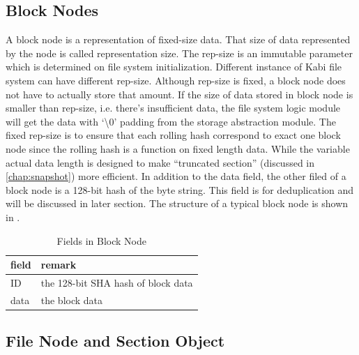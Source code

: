 \subsection{Block Nodes}

    A block node is a representation of fixed-size data. That size of data represented by the node is called representation size. The rep-size is an immutable parameter which is determined on file system initialization. Different instance of Kabi file system can have different rep-size. Although rep-size is fixed, a block node does not have to actually store that amount. If the size of data stored in block node is smaller than rep-size, i.e. there's insufficient data, the file system logic module will get the data with `\textbackslash0' padding from the storage abstraction module. The fixed rep-size is to ensure that each rolling hash correspond to exact one block node since the rolling hash is a function on fixed length data. While the variable actual data length is designed to make ``truncated section'' (discussed in \cref{chap:snapshot}) more efficient. In addition to the data field, the other filed of a block node is a 128-bit hash of the byte string. This field is for deduplication and will be discussed in later section. The structure of a typical block node is shown in .

\begin{table}[t]
\begin{center}
\begin{tabular}{ll}
\toprule
field & remark\\
\midrule
ID & the 128-bit SHA hash of block data\\
data & the block data\\
\bottomrule
\end{tabular}
\end{center}
\caption{Fields in Block Node}
\label{tab:block_fields}
\end{table}

\subsection{File Node and Section Object}

